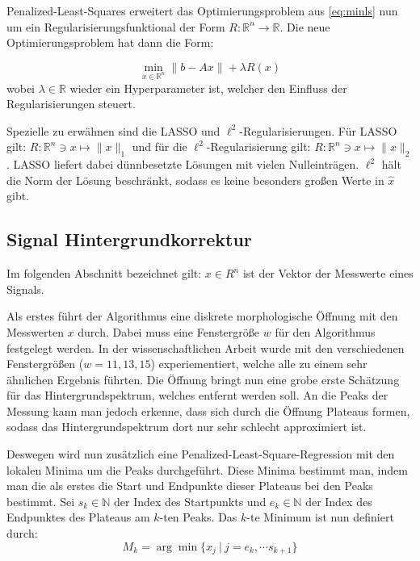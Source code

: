 \documentclass{article}
\newcommand{\R}[0]{\mathbb{R}}
\newcommand{\N}[0]{\mathbb{N}}
\begin{document}
Penalized-Least-Squares erweitert das Optimierungsproblem aus \ref{eq:minls} nun um ein Regularisierungsfunktional der Form $R: \R^n \to \R$.
Die neue Optimierungsproblem hat dann die Form:

\begin{equation}
    \min\limits_{x \in \R^n} \lVert b - Ax \rVert + \lambda R(x)
\end{equation}
wobei $\lambda \in \R$ wieder ein Hyperparameter ist, welcher den Einfluss der Regularisierungen steuert.

Spezielle zu erwähnen sind die LASSO und $\ell^2$-Regularisierungen. Für LASSO gilt: $R: \R^n \ni x \mapsto \lVert x \rVert_1$ und für die $\ell^2$-Regularisierung gilt: $R: \R^n \ni x \mapsto \lVert x \rVert_2$.
LASSO liefert dabei dünnbesetzte Lösungen mit vielen Nulleinträgen. 
$\ell^2$ hält die Norm der Lösung beschränkt, sodass es keine besonders großen Werte in $\hat{x}$ gibt.

\subsection{Signal Hintergrundkorrektur}

Im folgenden Abschnitt bezeichnet gilt: $x \in R^n$ ist der Vektor der Messwerte eines Signals. 

Als erstes führt der Algorithmus eine diskrete morphologische Öffnung mit den Messwerten $x$ durch. Dabei muss eine Fenstergröße $w$ für den Algorithmus festgelegt werden.
In der wissenschaftlichen Arbeit wurde mit den verschiedenen Fenstergrößen ($w=11,13,15$) experiementiert, welche alle zu einem sehr ähnlichen Ergebnis führten.
Die Öffnung bringt nun eine grobe erste Schätzung für das Hintergrundspektrum, welches entfernt werden soll.
An die Peaks der Messung kann man jedoch erkenne, dass sich durch die Öffnung Plateaus formen, sodass das Hintergrundspektrum dort nur sehr schlecht approximiert ist.

Deswegen wird nun zusätzlich eine Penalized-Least-Square-Regression mit den lokalen Minima um die Peaks durchgeführt.
Diese Minima bestimmt man, indem man die als erstes die Start und Endpunkte dieser Plateaus bei den Peaks bestimmt.
Sei $s_k \in \N$ der Index des Startpunkts und $e_k \in \N$ der Index des Endpunktes des Plateaus am $k$-ten Peaks. Das $k$-te Minimum ist nun definiert durch:
\begin{equation}
    M_k = \arg\min \{x_j \: | \: j=e_k,\cdots s_{k+1}\}
\end{equation}
\end{document}
